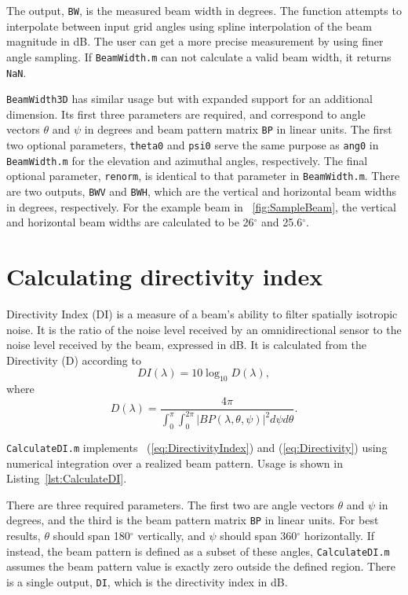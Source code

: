 The output, \texttt{BW}, is the measured beam width in degrees. The function attempts to interpolate between input grid angles using spline interpolation of the beam magnitude in dB. The user can get a more precise measurement by using finer angle sampling. If \texttt{BeamWidth.m} can not calculate a valid beam width, it returns \texttt{NaN}.

\texttt{BeamWidth3D} has similar usage but with expanded support for an additional dimension. Its first three parameters are required, and correspond to angle vectors $\theta$ and $\psi$ in degrees and beam pattern matrix \texttt{BP} in linear units. The first two optional parameters, \texttt{theta0} and \texttt{psi0} serve the same purpose as \texttt{ang0} in \texttt{BeamWidth.m} for the elevation and azimuthal angles, respectively. The final optional parameter, \texttt{renorm}, is identical to that parameter in \texttt{BeamWidth.m}. There are two outputs, \texttt{BWV} and \texttt{BWH}, which are the vertical and horizontal beam widths in degrees, respectively. For the example beam in \figname~\ref{fig:SampleBeam}, the vertical and horizontal beam widths are calculated to be 26$^\circ$ and 25.6$^\circ$.

\section{Calculating directivity index}

Directivity Index (DI) is a measure of a beam's ability to filter spatially isotropic noise. It is the ratio of the noise level received by an omnidirectional sensor to the noise level received by the beam, expressed in dB. It is calculated from the Directivity (D) according to
\begin{equation}
DI(\lambda) = 10\log_{10}D(\lambda),\label{eq:DirectivityIndex}
\end{equation}
where
\begin{equation}
D(\lambda) = \frac{4\pi}{\int_0^{\pi}\int_0^{2\pi}|BP(\lambda,\theta,\psi)|^2d\psi{d\theta}}.\label{eq:Directivity}
\end{equation}

\texttt{CalculateDI.m} implements \eqnnames~(\ref{eq:DirectivityIndex}) and (\ref{eq:Directivity}) using numerical integration over a realized beam pattern. Usage is shown in Listing~\ref{lst:CalculateDI}.

There are three required parameters. The first two are angle vectors $\theta$ and $\psi$ in degrees, and the third is the beam pattern matrix \texttt{BP} in linear units. For best results, $\theta$ should span 180$^\circ$ vertically, and $\psi$ should span 360$^\circ$ horizontally. If instead, the beam pattern is defined as a subset of these angles, \texttt{CalculateDI.m} assumes the beam pattern value is exactly zero outside the defined region. There is a single output, \texttt{DI}, which is the directivity index in dB.


